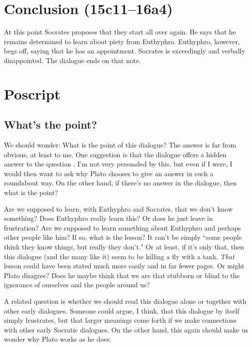 \documentclass[11pt]{article}
\begin{document}


\section{Conclusion (15c11--16a4)}

At this point Socrates proposes that they start all over again.  He says
that he remains determined to learn about piety from Euthyphro.  Euthyphro,
however, begs off, saying that he has an appointment.  Socrates is
exceedingly and verbally disappointed. The dialogue ends on that note.


\section{Poscript}

\subsection{What's the point?}

We should wonder: What is the point of this dialogue?  The answer is far
from obvious, at least to me.  One suggestion is that the dialogue offers
a hidden answer to the question .  I'm not very
persuaded by this, but even if I were, I would then want to ask why Plato
chooses to give an answer in such a roundabout way.  On the other hand, if
there's no answer in the dialogue, then what is the point?

Are we supposed to learn, with Euthyphro and Socrates, that we don't know
something?  Does Euthyphro really learn this?  Or does he just leave in
frustration?  Are we supposed to learn something about Euthyphro and
perhaps other people like him?  If so, what is the lesson?  It can't be
simply ``some people think they know things, but really they don't."  Or at
least, if it's only that, then this dialogue (and the many like it) seem to
be killing a fly with a tank.  \emph{That} lesson could have been stated
much more easily and in far fewer pages.  Or might Plato disagree?  Does he
maybe think that we are that stubborn or blind to the ignorance of
ourselves and the people around us?

A related question is whether we should read this dialogue alone or
together with other early dialogues.  Someone could argue, I think, that
this dialogue by itself simply frustrates, but that larger meanings come
forth if we make connections with other early Socratic dialogues.  On the
other hand, this again should make us wonder why Plato works as he does.
\end{document}
